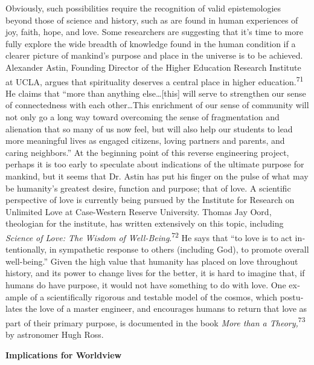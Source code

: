 Obviously, such possibilities require the recognition of valid
epistemologies beyond those of science and history, such as are found
in human experiences of joy, faith, hope, and love. Some researchers
are suggesting that it’s time to more fully explore the wide breadth of
knowledge found in the human condition if a clearer picture of
mankind’s purpose and place in the universe is to be achieved.
Alexander Astin, Founding Director of the Higher Education Research
Institute at UCLA, argues that spirituality deserves a central place in
higher education.\textsuperscript{71} He claims that “more than
anything else…[this] will serve to strengthen our sense of
connectedness with each other…This enrichment of our sense of community
will not only go a long way toward overcoming the sense of
fragmentation and alienation that so many of us now feel, but will also
help our students to lead more meaningful lives as engaged citizens,
loving partners and parents, and caring neighbors.” At the beginning
point of this reverse engineering project, perhaps it is too early to
speculate about indications of the ultimate purpose for mankind, but it
seems that Dr. Astin has put his finger on the pulse of what may be
humanity’s greatest desire, function and purpose; that of love. A
scientific perspective of love is currently being pursued by the
Institute for Research on Unlimited Love at Case-Western Reserve
University. Thomas Jay Oord, theologian for the institute, has written
extensively on this topic, including \textit{Science of Love: The
Wisdom of Well-Being}.\textsuperscript{72} He says that
“\foreignlanguage{english}{to love is to act intentionally, in
sympathetic response to others (including God), to promote overall
well-being.” Given the high value that humanity has placed on love
throughout history, and its power to change lives for the better, it is
hard to imagine that, if humans do have purpose, it would not have
something to do with love. One example of a scientifically rigorous and
testable model of the cosmos, which postulates the love of a master
engineer, and encourages humans to return that love as part of their
primary purpose, is documented in the book
}\foreignlanguage{english}{\textit{More than a
Theory,}}\foreignlanguage{english}{\textsuperscript{73}}\foreignlanguage{english}{
by astronomer Hugh Ross.}


\bigskip

\bfseries
Implications for Worldview


